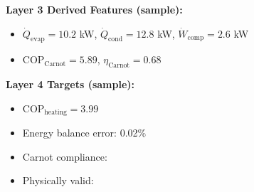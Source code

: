 \documentclass[11pt]{article}
\begin{document}
\textbf{Layer 3 Derived Features (sample):}
\begin{itemize}
\item $\dot{Q}_{\text{evap}} = 10.2$ kW, $\dot{Q}_{\text{cond}} = 12.8$ kW, $\dot{W}_{\text{comp}} = 2.6$ kW
\item $\text{COP}_{\text{Carnot}} = 5.89$, $\eta_{\text{Carnot}} = 0.68$
\end{itemize}

\textbf{Layer 4 Targets (sample):}
\begin{itemize}
\item $\text{COP}_{\text{heating}} = 3.99$
\item Energy balance error: 0.02\%
\item Carnot compliance: \checkmark
\item Physically valid: \checkmark
\end{itemize}
\end{document}
